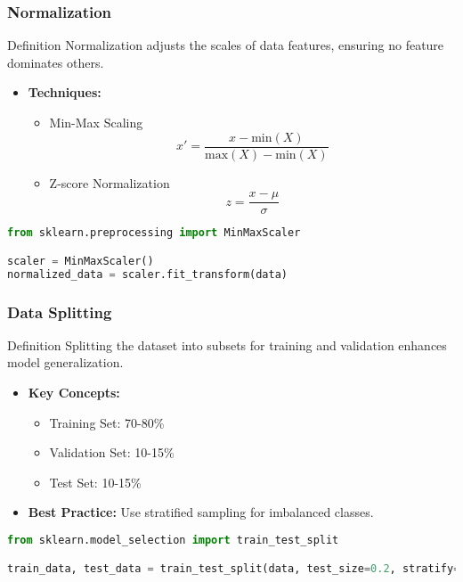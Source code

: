 \documentclass[aspectratio=169]{beamer}
\begin{document}
\begin{frame}[fragile]
    \frametitle{Normalization}
    \begin{block}{Definition}
        Normalization adjusts the scales of data features, ensuring no feature dominates others.
    \end{block}

    \begin{itemize}
        \item \textbf{Techniques:}
        \begin{itemize}
            \item Min-Max Scaling
            \begin{equation}
            x' = \frac{x - \text{min}(X)}{\text{max}(X) - \text{min}(X)}
            \end{equation}
            \item Z-score Normalization
            \begin{equation}
            z = \frac{x - \mu}{\sigma}
            \end{equation}
        \end{itemize}
    \end{itemize}
    
    \begin{lstlisting}[language=Python]
from sklearn.preprocessing import MinMaxScaler

scaler = MinMaxScaler()
normalized_data = scaler.fit_transform(data)
    \end{lstlisting}
\end{frame}

\begin{frame}[fragile]
    \frametitle{Data Splitting}
    \begin{block}{Definition}
        Splitting the dataset into subsets for training and validation enhances model generalization.
    \end{block}

    \begin{itemize}
        \item \textbf{Key Concepts:}
        \begin{itemize}
            \item Training Set: 70-80\%
            \item Validation Set: 10-15\%
            \item Test Set: 10-15\%
        \end{itemize}
        
        \item \textbf{Best Practice:} Use stratified sampling for imbalanced classes.
    \end{itemize}
    
    \begin{lstlisting}[language=Python]
from sklearn.model_selection import train_test_split

train_data, test_data = train_test_split(data, test_size=0.2, stratify=data['target'])
    \end{lstlisting}
\end{frame}
\end{document}
